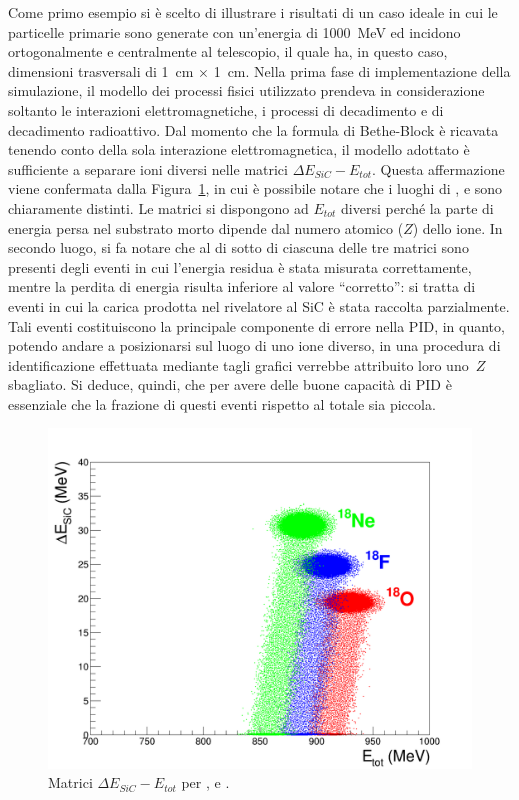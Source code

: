 Come primo esempio si è scelto di illustrare i risultati di un caso ideale in cui le particelle primarie sono generate con un'energia di 1000~MeV ed incidono ortogonalmente e centralmente al telescopio, il quale ha, in questo caso, dimensioni trasversali di 1~cm $\times$ 1~cm.
Nella prima fase di implementazione della simulazione, il modello dei processi fisici utilizzato prendeva in considerazione soltanto le interazioni elettromagnetiche, i processi di decadimento e di decadimento radioattivo.
Dal momento che la formula di Bethe-Block è ricavata tenendo conto della sola interazione elettromagnetica, il modello adottato è sufficiente a separare ioni diversi nelle matrici $\Delta E_{SiC} - E_{tot}$.
Questa affermazione viene confermata dalla Figura~\ref{fig:deltaE_ETot}, in cui è possibile notare che i luoghi di ,  e  sono chiaramente distinti.
Le matrici si dispongono ad $E_{tot}$ diversi perché la parte di energia persa nel substrato morto dipende dal numero atomico ($Z$) dello ione.
In secondo luogo, si fa notare che al di sotto di ciascuna delle tre matrici sono presenti degli eventi in cui l'energia residua è stata misurata correttamente, mentre la perdita di energia risulta inferiore al valore ``corretto'': si tratta di eventi in cui la carica prodotta nel rivelatore al SiC è stata raccolta parzialmente. 
Tali eventi costituiscono la principale componente di errore nella PID, in quanto, potendo andare a posizionarsi sul luogo di uno ione diverso, in una procedura di identificazione effettuata mediante tagli grafici verrebbe attribuito loro uno~$Z$ sbagliato.
Si deduce, quindi, che per avere delle buone capacità di PID è essenziale che la frazione di questi eventi rispetto al totale sia piccola.


\begin{figure} [!p]
	\centering
	\includegraphics[width=\textwidth, keepaspectratio]{Grafici_Tesi/Particelle_monocromatiche/deltaE_ETot_punti_grandi.png}
	\caption{Matrici $\Delta E_{SiC} - E_{tot}$ per ,  e .} \label{fig:deltaE_ETot}
\end{figure}




